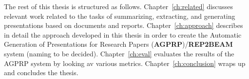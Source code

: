 
The rest of this thesis is structured as follows. Chapter~\ref{ch:related} discusses relevant work related to the tasks of summarizing, extracting, and generating presentations based on documents and reports. Chapter~\ref{ch:approach} describes in detail the approach developed in this thesis in order to create the Automatic Generation of Presentations for Research Papers (\textbf{AGPRP})/\textbf{REP2BEAM} system (naming to be decided). Chapter~\ref{ch:eval} evaluates the results of the AGPRP system by looking av various metrics. Chapter~\ref{ch:conclusion} wraps up and concludes the thesis.